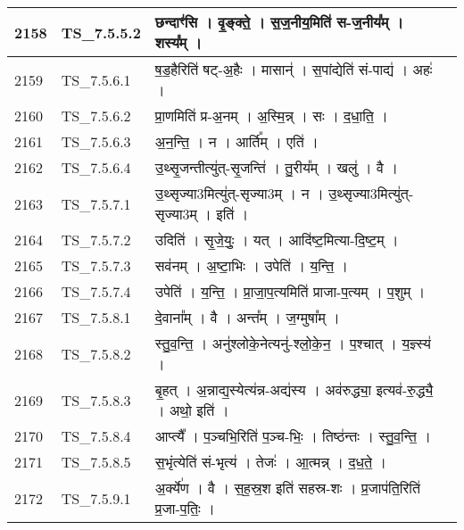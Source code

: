 \documentclass[17pt]{extarticle}
\begin{document}
\begin{longtable}{||p{0.4in}||p{0.9in}||p{4.0in}||p{0.9in}||}
        \hline
            2158 & TS\_7.5.5.2 & छन्दाꣳ॑सि   ।   वृ॒ङ्क्ते॒   ।   स॒ज॒नीय॒मिति॑ स{-}ज॒नीय᳚म्   ।   शस्य᳚म्   ।    &      \\
        \hline
            2159 & TS\_7.5.6.1 & ष॒ड॒हैरिति॑ षट्{-}अ॒हैः   ।   मासान्॑   ।   स॒पांद्येति॑ सं{-}पाद्य॑   ।   अहः॑   ।    &      \\
        \hline
            2160 & TS\_7.5.6.2 & प्रा॒णमिति॑ प्र{-}अ॒नम्   ।   अ॒स्मि॒न्न्   ।   सः   ।   द॒धा॒ति॒   ।    &      \\
        \hline
            2161 & TS\_7.5.6.3 & अ॒न॒न्ति॒   ।   न   ।   आर्ति᳚म्   ।   एति॑   ।    &      \\
        \hline
            2162 & TS\_7.5.6.4 & उ॒थ्सृ॒जन्तीत्यु॑त्{-}सृ॒जन्ति॑   ।   तु॒रीय᳚म्   ।   खलु॑   ।   वै   ।    &      \\
        \hline
            2163 & TS\_7.5.7.1 & उ॒थ्सृज्या3मित्यु॑त्{-}सृज्या3म्   ।   न   ।   उ॒थ्सृज्या3मित्यु॑त्{-} सृज्या3म्   ।   इति॑   ।    &      \\
        \hline
            2164 & TS\_7.5.7.2 & उदिति॑   ।   सृ॒जे॒युः॒   ।   यत्   ।   आदि॑ष्ट॒मित्या{-}दि॒ष्ट॒म्   ।    &      \\
        \hline
            2165 & TS\_7.5.7.3 & सव॑नम्   ।   अ॒ष्टा॒भिः   ।   उपेति॑   ।   य॒न्ति॒   ।    &      \\
        \hline
            2166 & TS\_7.5.7.4 & उपेति॑   ।   य॒न्ति॒   ।   प्रा॒जा॒प॒त्यमिति॑ प्राजा{-}प॒त्यम्   ।   प॒शुम्   ।    &      \\
        \hline
            2167 & TS\_7.5.8.1 & दे॒वाना᳚म्   ।   वै   ।   अन्त᳚म्   ।   ज॒ग्मुषा᳚म्   ।    &      \\
        \hline
            2168 & TS\_7.5.8.2 & स्तु॒व॒न्ति॒   ।   अनु॑श्लोके॒नेत्यनु॑{-}श्लो॒के॒न॒   ।   प॒श्चात्   ।   य॒ज्ञ्स्य॑   ।    &      \\
        \hline
            2169 & TS\_7.5.8.3 & बृ॒हत्   ।   अ॒न्नाद्य॒स्येत्य॑न्न{-}अद्य॑स्य   ।   अव॑रुद्ध्या॒ इत्यव॑{-}रु॒द्ध्यै॒   ।   अथो॒ इति॑   ।    &      \\
        \hline
            2170 & TS\_7.5.8.4 & आप्त्यै᳚   ।   प॒ञ्चभि॒रिति॑ प॒ञ्च{-}भिः॒   ।   तिष्ठ॑न्तः   ।   स्तु॒व॒न्ति॒   ।    &      \\
        \hline
            2171 & TS\_7.5.8.5 & स॒भृंत्येति॑ सं{-}भृत्य॑   ।   तेजः॑   ।   आ॒त्मन्न्   ।   द॒ध॒ते॒   ।    &      \\
        \hline
            2172 & TS\_7.5.9.1 & अ॒र्क्ये॑ण   ।   वै   ।   स॒ह॒स्र॒श इति॑ सहस्र{-}शः   ।   प्र॒जाप॑ति॒रिति॑ प्र॒जा{-}प॒तिः॒   ।    &      \\

\end{longtable}
\end{document}
